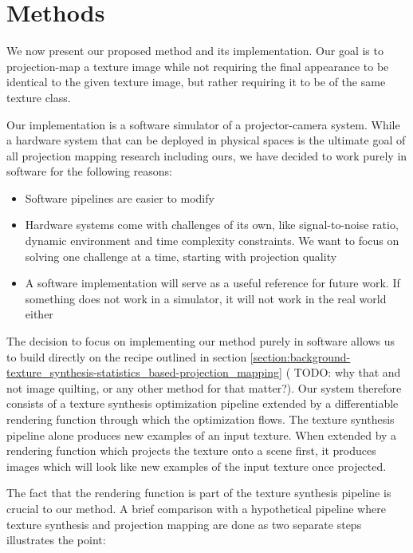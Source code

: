 \chapter{Methods}
\label{chapter:methods}


We now present our proposed method and its implementation. Our goal is to projection-map a texture image while not requiring the final appearance to be identical to the given texture image, but rather requiring it to be of the same texture class.

Our implementation is a software simulator of a projector-camera system. While a hardware system that can be deployed in physical spaces is the ultimate goal of all projection mapping research including ours, we have decided to work purely in software for the following reasons:

\begin{itemize}
    \item Software pipelines are easier to modify
    \item Hardware systems come with challenges of its own, like signal-to-noise ratio, dynamic environment and time complexity constraints. We want to focus on solving one challenge at a time, starting with projection quality
    \item A software implementation will serve as a useful reference for future work. If something does not work in a simulator, it will not work in the real world either
\end{itemize}

The decision to focus on implementing our method purely in software allows us to build directly on the recipe outlined in section \ref{section:background-texture_synthesis-statistics_based-projection_mapping} ({\color{red} TODO: why that and not image quilting, or any other method for that matter?}). Our system therefore consists of a texture synthesis optimization pipeline extended by a differentiable rendering function through which the optimization flows. The texture synthesis pipeline alone produces new examples of an input texture. When extended by a rendering function which projects the texture onto a scene first, it produces images which will look like new examples of the input texture once projected.

The fact that the rendering function is part of the texture synthesis pipeline is crucial to our method. A brief comparison with a hypothetical pipeline where texture synthesis and projection mapping are done as two separate steps illustrates the point:

